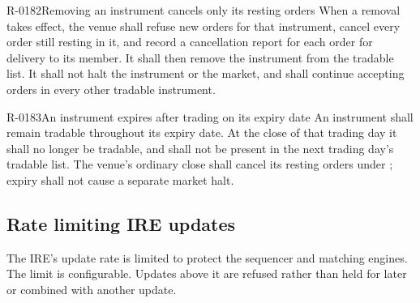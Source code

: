 \begin{requirement}{R-0182}{Removing an instrument cancels only its resting orders}
  When a removal takes effect, the venue shall refuse new orders for that
  instrument, cancel every order still resting in it, and record a cancellation
  report for each order for delivery to its member. It shall then remove the
  instrument from the tradable list. It shall not halt the instrument or the
  market, and shall continue accepting orders in every other tradable
  instrument.
\end{requirement}

\begin{requirement}{R-0183}{An instrument expires after trading on its expiry date}
  An instrument shall remain tradable throughout its expiry date. At the
  close of that trading day it shall no longer be tradable, and shall not be
  present in the next trading day's tradable list. The venue's ordinary close
  shall cancel its resting orders under ; expiry shall not cause
  a separate market halt.
\end{requirement}

\subsection{Rate limiting IRE updates}

The IRE's update rate is limited to protect the sequencer and matching
engines. The limit is configurable. Updates above it are refused rather than
held for later or combined with another update.

